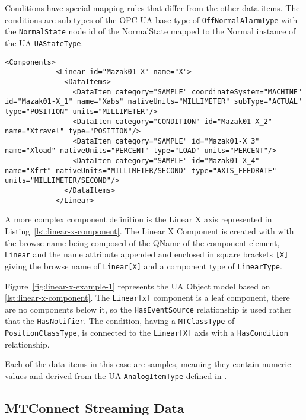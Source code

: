 Conditions have special mapping rules that differ from the other data items. The conditions are sub-types of the OPC UA base type of \texttt{OffNormalAlarmType} with the \texttt{NormalState} node id of the NormalState mapped to the Normal instance of the UA \texttt{UAStateType}.

\begin{lstlisting}[firstnumber=last,%
    caption={Linear X Component},label={lst:linear-x-component}]
          <Components>
            <Linear id="Mazak01-X" name="X">
              <DataItems>
                <DataItem category="SAMPLE" coordinateSystem="MACHINE" id="Mazak01-X_1" name="Xabs" nativeUnits="MILLIMETER" subType="ACTUAL" type="POSITION" units="MILLIMETER"/>
                <DataItem category="CONDITION" id="Mazak01-X_2" name="Xtravel" type="POSITION"/>
                <DataItem category="SAMPLE" id="Mazak01-X_3" name="Xload" nativeUnits="PERCENT" type="LOAD" units="PERCENT"/>
                <DataItem category="SAMPLE" id="Mazak01-X_4" name="Xfrt" nativeUnits="MILLIMETER/SECOND" type="AXIS_FEEDRATE" units="MILLIMETER/SECOND"/>
              </DataItems>
            </Linear>
\end{lstlisting}

A more complex component definition is the Linear X axis represented in Listing~\ref{lst:linear-x-component}. The Linear X Component is created with with the browse name being composed of the QName of the component element, \texttt{Linear} and the name attribute appended and enclosed in square brackets \texttt{[X]} giving the browse name of \texttt{Linear[X]} and a component type of \texttt{LinearType}.



Figure~\ref{fig:linear-x-example-1} represents the UA Object model based on \ref{lst:linear-x-component}. The \texttt{Linear[x]} component is a leaf component, there are no components below it, so the \texttt{HasEventSource} relationship is used rather that the \texttt{HasNotifier}. The condition, having a \texttt{MTClassType} of \texttt{PositionClassType}, is connected to the \texttt{Linear[X]} axis with a \texttt{HasCondition} relationship.

Each of the data items in this case are samples, meaning they contain numeric values and derived from the UA \texttt{AnalogItemType} defined in \cite{UAPart8}.

\FloatBarrier

\subsection{MTConnect Streaming Data}


